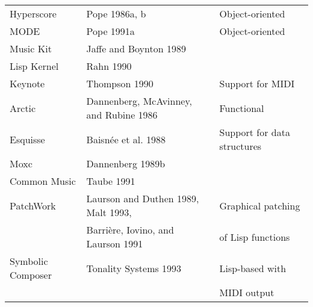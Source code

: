 \begin{table}[htbp]
\begin{tabular}{ *{3}{l} }
		Hyperscore & Pope 1986a, b & Object-oriented \\
		MODE & Pope 1991a & Object-oriented \\
		Music Kit & Jaffe and Boynton 1989 & \\
		Lisp Kernel & Rahn 1990 & \\
		Keynote & Thompson 1990 & Support for MIDI \\
		Arctic & Dannenberg, McAvinney, and Rubine 1986 & Functional \\
		Esquisse & Baisnée et al. 1988 & Support for data structures \\
		Moxc & Dannenberg 1989b & \\
		Common Music & Taube 1991 & \\
		PatchWork & Laurson and Duthen 1989, Malt 1993, & Graphical patching \\
		& Barrière, Iovino, and Laurson 1991 & of Lisp functions \\
		Symbolic Composer & Tonality Systems 1993 & Lisp-based with \\
		&& MIDI output \\
		\hline
	\end{tabular}
\end{table}
